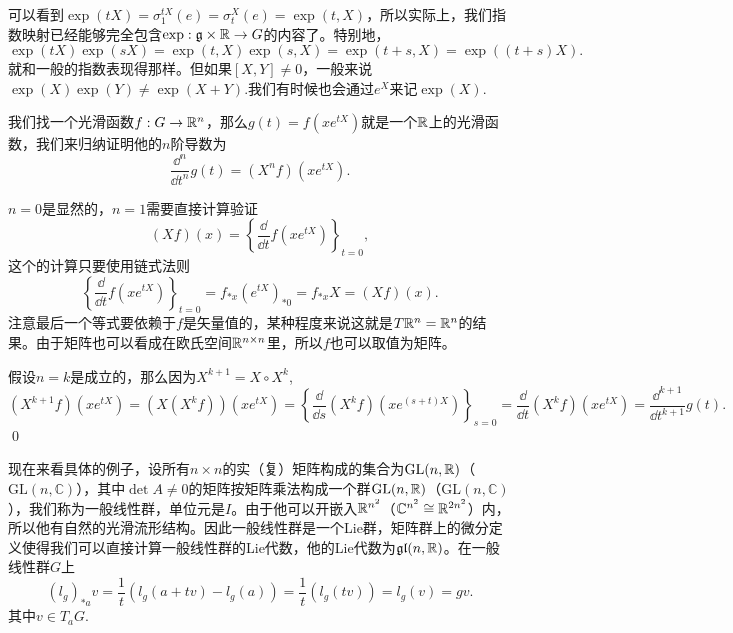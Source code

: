 \documentclass[10pt]{article}
\newcommand{\cc}{\mathbb{C}}
\newcommand{\lag}{{\mathfrak{g}}}
\begin{document}
可以看到$\exp(tX)=\sigma^{tX}_1(e)=\sigma^{X}_t(e)=\exp(t,X)$，所以实际上，我们指数映射已经能够完全包含$\exp:\lag\times \rr\to G$的内容了。特别地，
\[
	\exp(tX)\exp(sX)=\exp(t,X)\exp(s,X)=\exp(t+s,X)=\exp((t+s)X).
\]
就和一般的指数表现得那样。但如果$[X,Y]\neq 0$，一般来说$\exp(X)\exp(Y)\neq \exp(X+Y)$.我们有时候也会通过$e^{X}$来记$\exp(X)$.

\lem \label{exp}我们找一个光滑函数$f:G\to \mathbb{R}^n$，那么$g(t)=f(xe^{tX})$就是一个$\mathbb{R}$上的光滑函数，我们来归纳证明他的$n$阶导数为
\[
	\frac{\dd^n}{\dd t^n}g(t)=(X^nf)(x e^{tX}).
\]

\proof $n=0$是显然的，$n=1$需要直接计算验证
\[
	(Xf)(x)=\left\{\frac{\dd}{\dd t}f(x e^{tX})\right\}_{t=0},
\]
这个的计算只要使用链式法则
\[
	\left\{\frac{\dd}{\dd t}f(x e^{tX})\right\}_{t=0}=f_{*x}(e^{tX})_{*0}=f_{*x}X=(Xf)(x).
\]
注意最后一个等式要依赖于$f$是矢量值的，某种程度来说这就是$T\mathbb{R}^n=\mathbb{R}^n$的结果。由于矩阵也可以看成在欧氏空间$\mathbb{R}^{n\times n}$里，所以$f$也可以取值为矩阵。

假设$n=k$是成立的，那么因为$X^{k+1}=X\circ X^k$,
\[
	(X^{k+1}f)(x e^{tX})=(X(X^{k}f))(x e^{tX})=\left\{\frac{\dd}{\dd s}(X^kf)(x e^{(s+t)X})\right\}_{s=0}=\frac{\dd}{\dd t}(X^kf)(x e^{tX})=\frac{\dd^{k+1}}{\dd t^{k+1}}g(t).
\]\qed



\para 现在来看具体的例子，设所有$n\times n$的实（复）矩阵构成的集合为$\mathrm{GL}(n,\mathbb{R})$（$\mathrm{GL}(n,\cc)$），其中$\det A\neq 0$的矩阵按矩阵乘法构成一个群$\mathrm{GL}(n,\mathbb{R})$（$\mathrm{GL}(n,\cc)$），我们称为一般线性群，单位元是$I$。由于他可以开嵌入$\mathbb{R}^{n^2}$（$\cc^{n^2}\cong \rr^{2n^2}$）内，所以他有自然的光滑流形结构。因此一般线性群是一个Lie群，矩阵群上的微分定义使得我们可以直接计算一般线性群的Lie代数，他的Lie代数为$\mathfrak{gl}(n,\mathbb{R})$。在一般线性群$G$上
\[
	(l_g)_{*a}v=\frac{1}{t}(l_g(a+tv)-l_g(a))
	=\frac{1}{t}(l_g(tv))=l_g(v)=gv.
\]
其中$v\in T_aG$.
\end{document}
